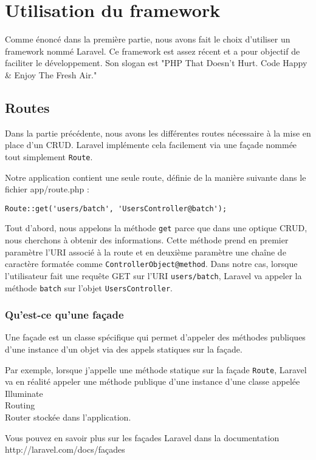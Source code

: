 \chapter{Utilisation du framework}

Comme énoncé dans la première partie, nous avons fait le choix d'utiliser un framework nommé Laravel. Ce framework est assez récent et a pour objectif de faciliter le développement. Son slogan est "PHP That Doesn't Hurt. Code Happy \& Enjoy The Fresh Air."

\section{Routes}

Dans la partie précédente, nous avons les différentes routes nécessaire à la mise en place d'un CRUD. Laravel implémente cela facilement via une façade nommée tout simplement \verb|Route|.

Notre application contient une seule route, définie de la manière suivante dans le fichier app/route.php :
\begin{verbatim}
Route::get('users/batch', 'UsersController@batch');
\end{verbatim}

Tout d'abord, nous appelons la méthode \verb|get| parce que dans une optique CRUD, nous cherchons à obtenir des informations. Cette méthode prend en premier paramètre l'URI associé à la route et en deuxième paramètre une chaîne de caractère  formatée comme \verb|ControllerObject@method|. Dans notre cas, lorsque l'utilisateur fait une requête GET sur l'URI \verb|users/batch|, Laravel va appeler la méthode \verb|batch| sur l'objet \verb|UsersController|.

\subsection{Qu'est-ce qu'une façade}

Une façade est un classe spécifique qui permet d'appeler des méthodes publiques d'une instance d'un objet via des appels statiques sur la façade.

Par exemple, lorsque j'appelle une méthode statique sur la façade \verb|Route|, Laravel va en réalité appeler une méthode publique d'une instance d'une classe appelée Illuminate\\Routing\\Router stockée dans l'application.

Vous pouvez en savoir plus sur les façades Laravel dans la documentation http://laravel.com/docs/façades

